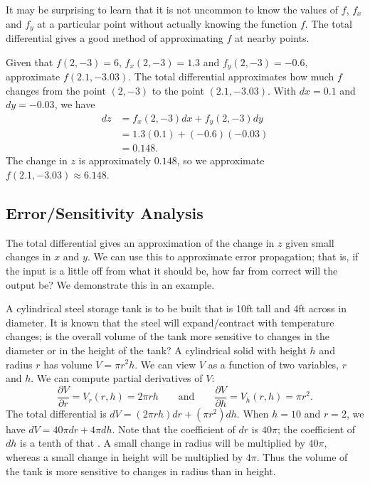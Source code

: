 It may be surprising to learn that it is not uncommon to know the values of $f$, $f_x$ and $f_y$ at a particular point without actually knowing the function $f$. The total differential gives a good method of approximating $f$ at nearby points.

\begin{example}\label{ex_totaldiff3}
Given that $f(2,-3) = 6$, $f_x(2,-3) = 1.3$ and $f_y(2,-3) = -0.6$, approximate $f(2.1,-3.03)$.
\solution
The total differential approximates how much $f$ changes from the point $(2,-3)$ to the point $(2.1,-3.03)$. With $dx = 0.1$ and $dy = -0.03$, we have
\begin{align*}
dz &= f_x(2,-3)dx + f_y(2,-3)dy\\
		&= 1.3(0.1) + (-0.6)(-0.03) \\
		&= 0.148.
\end{align*}
The change in $z$ is approximately $0.148$, so we approximate $f(2.1,-3.03)\approx 6.148$.
\end{example}

\subsection{Error/Sensitivity Analysis}

The total differential gives an approximation of the change in $z$ given small changes in $x$ and $y$. We can use this to approximate error propagation; that is, if the input is a little off from what it should be, how far from correct will the output be? We demonstrate this in an example.

\begin{example}\label{ex_totaldiff4}
A cylindrical steel storage tank is to be built that is 10ft tall and 4ft across in diameter. It is known that the steel will expand/contract with temperature changes; is the overall volume of the tank more sensitive to changes in the diameter or in the height of the tank?
\solution
A cylindrical solid with height $h$ and radius $r$ has volume $V = \pi r^2h$. We can view $V$ as a function of two variables, $r$ and $h$. We can compute partial derivatives of $V$:
\[\frac{\partial V}{\partial r} = V_r(r,h) = 2\pi rh \qquad \text{and}\qquad \frac{\partial V}{\partial h} = V_h(r,h) = \pi r^2.\]
The total differential is $dV = (2\pi rh)dr + (\pi r^2)dh.$ When $h = 10$ and $r = 2$, we have $dV = 40\pi dr + 4\pi dh$.
Note that the coefficient of $dr$ is $40\pi%
$; the coefficient of $dh$ is a tenth of that%
. A small change in radius will be multiplied by $40\pi$, whereas a small change in height will be multiplied by $4\pi$. Thus the volume of the tank is more sensitive to changes in radius than in height.
\end{example}

